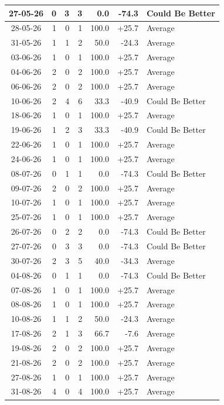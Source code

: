 \documentclass[journal]{IEEEtran}
\numberwithin{equation}{subsection}
\begin{document}
\begin{longtable}{|c|r|r|r|r|r|l|}
27-05-26 & 0 & 3 & 3 & 0.0 & -74.3 & Could Be Better\\ \hline
28-05-26 & 1 & 0 & 1 & 100.0 & +25.7 & Average\\ \hline
31-05-26 & 1 & 1 & 2 & 50.0 & -24.3 & Average\\ \hline
03-06-26 & 1 & 0 & 1 & 100.0 & +25.7 & Average\\ \hline
04-06-26 & 2 & 0 & 2 & 100.0 & +25.7 & Average\\ \hline
06-06-26 & 2 & 0 & 2 & 100.0 & +25.7 & Average\\ \hline
10-06-26 & 2 & 4 & 6 & 33.3 & -40.9 & Could Be Better\\ \hline
18-06-26 & 1 & 0 & 1 & 100.0 & +25.7 & Average\\ \hline
19-06-26 & 1 & 2 & 3 & 33.3 & -40.9 & Could Be Better\\ \hline
22-06-26 & 1 & 0 & 1 & 100.0 & +25.7 & Average\\ \hline
24-06-26 & 1 & 0 & 1 & 100.0 & +25.7 & Average\\ \hline
08-07-26 & 0 & 1 & 1 & 0.0 & -74.3 & Could Be Better\\ \hline
09-07-26 & 2 & 0 & 2 & 100.0 & +25.7 & Average\\ \hline
10-07-26 & 1 & 0 & 1 & 100.0 & +25.7 & Average\\ \hline
25-07-26 & 1 & 0 & 1 & 100.0 & +25.7 & Average\\ \hline
26-07-26 & 0 & 2 & 2 & 0.0 & -74.3 & Could Be Better\\ \hline
27-07-26 & 0 & 3 & 3 & 0.0 & -74.3 & Could Be Better\\ \hline
30-07-26 & 2 & 3 & 5 & 40.0 & -34.3 & Average\\ \hline
04-08-26 & 0 & 1 & 1 & 0.0 & -74.3 & Could Be Better\\ \hline
07-08-26 & 1 & 0 & 1 & 100.0 & +25.7 & Average\\ \hline
08-08-26 & 1 & 0 & 1 & 100.0 & +25.7 & Average\\ \hline
10-08-26 & 1 & 1 & 2 & 50.0 & -24.3 & Average\\ \hline
17-08-26 & 2 & 1 & 3 & 66.7 & -7.6 & Average\\ \hline
19-08-26 & 2 & 0 & 2 & 100.0 & +25.7 & Average\\ \hline
21-08-26 & 2 & 0 & 2 & 100.0 & +25.7 & Average\\ \hline
27-08-26 & 1 & 0 & 1 & 100.0 & +25.7 & Average\\ \hline
31-08-26 & 4 & 0 & 4 & 100.0 & +25.7 & Average\\ \hline

\end{longtable}
\end{document}
